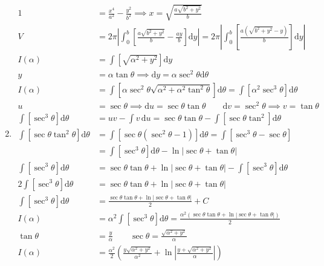 \documentclass[12pt, A4]{report}
\renewcommand{\d}{\text{d}}
\begin{document}
\begin{enumerate}
\begin{align*}
					\end{align*}
				\item
					\begin{align*}
						1 &= \frac{x^4}{a^2} - \frac{y^2}{b^2}
								\implies x = \sqrt{\frac{a\sqrt{b^2 + y^2}}{b}} \\
						V &= 2\pi\left|\int_0^b\left[\frac{a\sqrt{b^2 + y^2}}{b} - \frac{ay}{b}\right]\d y\right|
								= 2\pi\left|\int_0^b\left[\frac{a\left(\sqrt{b^2 + y^2} - y\right)}{b}\right]\d y\right| \\
						I(\alpha) &= \int\left[\sqrt{\alpha^2 + y^2}\right]\d y \\
						y &= \alpha\tan\theta  \implies \d y = \alpha\sec^2\theta\d\theta\\
						I(\alpha) &= \int\left[\alpha\sec^2\theta\sqrt{\alpha^2 + \alpha^2\tan^2\theta}\right]\d\theta 
								= \int\left[\alpha^2\sec^3\theta\right]\d\theta \\
						u &= \sec\theta 
								\implies \d u = \sec\theta\tan\theta 
								\qquad \d v = \sec^2\theta 
									\implies v = \tan\theta \\
						\int\left[\sec^3\theta\right]\d\theta &= uv - \int v\,\d u
								= \sec\theta\tan\theta - \int\left[\sec\theta\tan^2\right]\d\theta \\
						\int\left[\sec\theta\tan^2\theta\right]\d\theta &= \int\left[\sec\theta\left(\sec^2\theta - 1\right)\right]\d\theta
								= \int\left[\sec^3\theta - \sec\theta\right] \\
								&= \int\left[\sec^3\theta\right]\d\theta - \ln|\sec\theta + \tan\theta| \\
						\int\left[\sec^3\theta\right]\d\theta &= \sec\theta\tan\theta + \ln|\sec\theta + \tan\theta| - \int\left[\sec^3\theta\right]\d\theta \\
						2\int\left[\sec^3\theta\right]\d\theta &= \sec\theta\tan\theta + \ln|\sec\theta + \tan\theta| \\
						\int\left[\sec^3\theta\right]\d\theta &= \frac{\sec\theta\tan\theta + \ln|\sec\theta + \tan\theta|}{2} + C \\
						I(\alpha) &= \alpha^2\int\left[\sec^3\theta\right]\d\theta 
								= \frac{\alpha^2(\sec\theta\tan\theta + \ln|\sec\theta + \tan\theta|)}{2} \\
						\tan\theta &= \frac{y}{\alpha} \qquad \sec\theta = \frac{\sqrt{\alpha^2 + y^2}}{\alpha} \\
						I(\alpha) &= \frac{\alpha^2}{2}\left(\frac{y\sqrt{\alpha^2 + y^2}}{\alpha^2} + \ln\left|\frac{y + \sqrt{\alpha^2 + y^2}}{\alpha}\right|\right) \\

\end{align*}
\end{enumerate}
\end{document}
